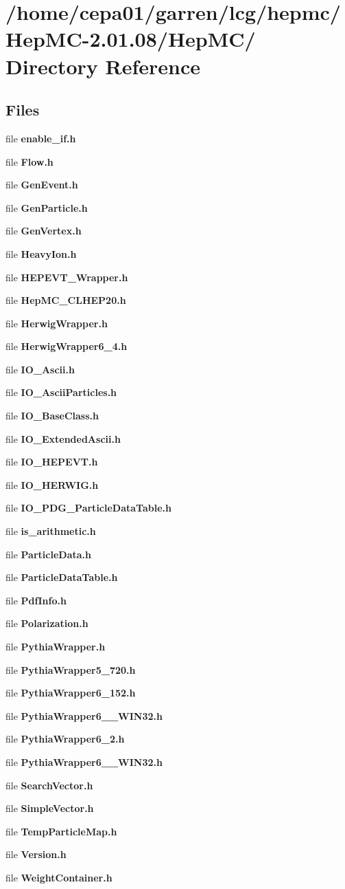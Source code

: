 \section{/home/cepa01/garren/lcg/hepmc/Hep\-MC-2.01.08/Hep\-MC/ Directory Reference}
\label{dir_ad823f63bf818e4989349037a7acc59c}
\subsection*{Files}
\begin{CompactItemize}
\item 
file {\bf enable\_\-if.h}
\item 
file {\bf Flow.h}
\item 
file {\bf Gen\-Event.h}
\item 
file {\bf Gen\-Particle.h}
\item 
file {\bf Gen\-Vertex.h}
\item 
file {\bf Heavy\-Ion.h}
\item 
file {\bf HEPEVT\_\-Wrapper.h}
\item 
file {\bf Hep\-MC\_\-CLHEP20.h}
\item 
file {\bf Herwig\-Wrapper.h}
\item 
file {\bf Herwig\-Wrapper6\_\-4.h}
\item 
file {\bf IO\_\-Ascii.h}
\item 
file {\bf IO\_\-Ascii\-Particles.h}
\item 
file {\bf IO\_\-Base\-Class.h}
\item 
file {\bf IO\_\-Extended\-Ascii.h}
\item 
file {\bf IO\_\-HEPEVT.h}
\item 
file {\bf IO\_\-HERWIG.h}
\item 
file {\bf IO\_\-PDG\_\-Particle\-Data\-Table.h}
\item 
file {\bf is\_\-arithmetic.h}
\item 
file {\bf Particle\-Data.h}
\item 
file {\bf Particle\-Data\-Table.h}
\item 
file {\bf Pdf\-Info.h}
\item 
file {\bf Polarization.h}
\item 
file {\bf Pythia\-Wrapper.h}
\item 
file {\bf Pythia\-Wrapper5\_\-720.h}
\item 
file {\bf Pythia\-Wrapper6\_\-152.h}
\item 
file {\bf Pythia\-Wrapper6\_\_\-WIN32.h}
\item 
file {\bf Pythia\-Wrapper6\_\-2.h}
\item 
file {\bf Pythia\-Wrapper6\_\_\-WIN32.h}
\item 
file {\bf Search\-Vector.h}
\item 
file {\bf Simple\-Vector.h}
\item 
file {\bf Temp\-Particle\-Map.h}
\item 
file {\bf Version.h}
\item 
file {\bf Weight\-Container.h}
\end{CompactItemize}
